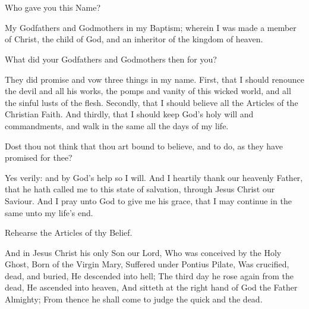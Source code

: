 

\chapter[A Catechism]{}





\centerline{}

 Who gave you this Name?

 My Godfathers and Godmothers in my Baptism; wherein I was made a member of Christ, the child of God, and an inheritor of the kingdom of heaven.

 What did your Godfathers and Godmothers then for you?

 They did promise and vow three things in my name. First, that I should renounce the devil and all his works, the pomps and vanity of this wicked world, and all the sinful lusts of the flesh. Secondly, that I should believe all the Articles of the Christian Faith. And thirdly, that I should keep God’s holy will and commandments, and walk in the same all the days of my life.

 Dost thou not think that thou art bound to believe, and to do, as they have promised for thee?

 Yes verily: and by God’s help so I will. And I heartily thank our heavenly Father, that he hath called me to this state of salvation, through Jesus Christ our Saviour. And I pray unto God to give me his grace, that I may continue in the same unto my life’s end.


\medskip
\centerline{}
\centerline{Rehearse the Articles of thy Belief.}


\centerline{}

And in Jesus Christ his only Son our Lord, Who was conceived by the Holy Ghost, Born of the Virgin Mary, Suffered under Pontius Pilate, Was crucified, dead, and buried, He descended into hell; The third day he rose again from the dead, He ascended into heaven, And sitteth at the right hand of God the Father Almighty; From thence he shall come to judge the quick and the dead.

